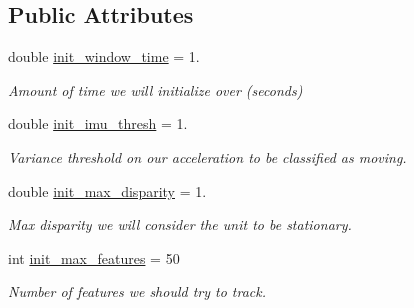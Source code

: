 \subsection*{Public Attributes}
\begin{DoxyCompactItemize}
\item 
\mbox{\label{structov__init_1_1InertialInitializerOptions_a8fc45471d64b463b54b49fafc2372391}} 
double \hyperlink{structov__init_1_1InertialInitializerOptions_a8fc45471d64b463b54b49fafc2372391}{init\+\_\+window\+\_\+time} = 1.
\begin{DoxyCompactList}\small\item\em Amount of time we will initialize over (seconds) \end{DoxyCompactList}\item 
\mbox{\label{structov__init_1_1InertialInitializerOptions_ae52064e908cacf87016bb56162890b5c}} 
double \hyperlink{structov__init_1_1InertialInitializerOptions_ae52064e908cacf87016bb56162890b5c}{init\+\_\+imu\+\_\+thresh} = 1.
\begin{DoxyCompactList}\small\item\em Variance threshold on our acceleration to be classified as moving. \end{DoxyCompactList}\item 
\mbox{\label{structov__init_1_1InertialInitializerOptions_a2ccadc84d3b4085f3d639efacc1850c6}} 
double \hyperlink{structov__init_1_1InertialInitializerOptions_a2ccadc84d3b4085f3d639efacc1850c6}{init\+\_\+max\+\_\+disparity} = 1.
\begin{DoxyCompactList}\small\item\em Max disparity we will consider the unit to be stationary. \end{DoxyCompactList}\item 
\mbox{\label{structov__init_1_1InertialInitializerOptions_a442ed53391151e45582a365c057ac492}} 
int \hyperlink{structov__init_1_1InertialInitializerOptions_a442ed53391151e45582a365c057ac492}{init\+\_\+max\+\_\+features} = 50
\begin{DoxyCompactList}\small\item\em Number of features we should try to track. \end{DoxyCompactList}\item 

\end{DoxyCompactItemize}
